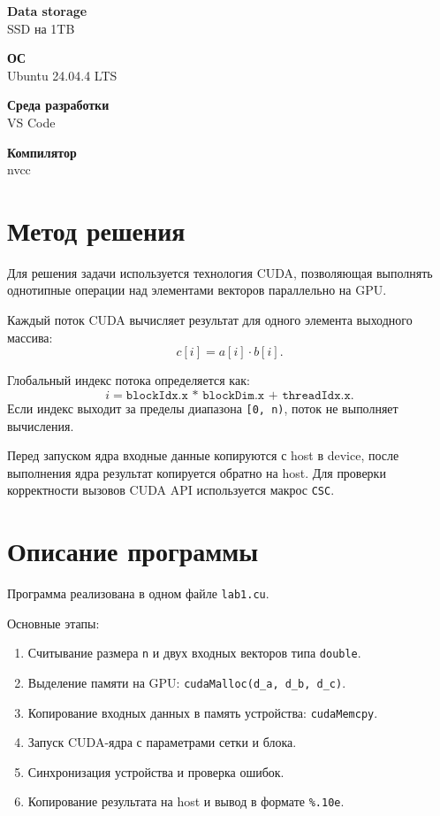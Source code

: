 \documentclass[a4paper,14pt]{extarticle}
\begin{document}
\vspace{0.2cm}
\textbf{Data storage}\\
SSD на 1TB

\vspace{0.2cm}
\textbf{ОС}\\
Ubuntu 24.04.4 LTS

\vspace{0.2cm}
\textbf{Среда разработки}\\
VS Code

\vspace{0.2cm}
\textbf{Компилятор}\\
nvcc

\section*{Метод решения}
Для решения задачи используется технология CUDA, позволяющая выполнять
однотипные операции над элементами векторов параллельно на GPU.

Каждый поток CUDA вычисляет результат для одного элемента выходного массива:
\[
c[i] = a[i] \cdot b[i].
\]

Глобальный индекс потока определяется как:
\[
i = \texttt{blockIdx.x * blockDim.x + threadIdx.x}.
\]
Если индекс выходит за пределы диапазона \texttt{[0, n)}, поток не выполняет вычисления.

Перед запуском ядра входные данные копируются с host в device,
после выполнения ядра результат копируется обратно на host.
Для проверки корректности вызовов CUDA API используется макрос \texttt{CSC}.

\section*{Описание программы}
Программа реализована в одном файле \texttt{lab1.cu}.

Основные этапы:
\begin{enumerate}
    \item Считывание размера \texttt{n} и двух входных векторов типа \texttt{double}.
    \item Выделение памяти на GPU: \texttt{cudaMalloc(d\_a, d\_b, d\_c)}.
    \item Копирование входных данных в память устройства: \texttt{cudaMemcpy}.
    \item Запуск CUDA-ядра с параметрами сетки и блока.
    \item Синхронизация устройства и проверка ошибок.
    \item Копирование результата на host и вывод в формате \texttt{\%.10e}.
\end{enumerate}
\end{document}
